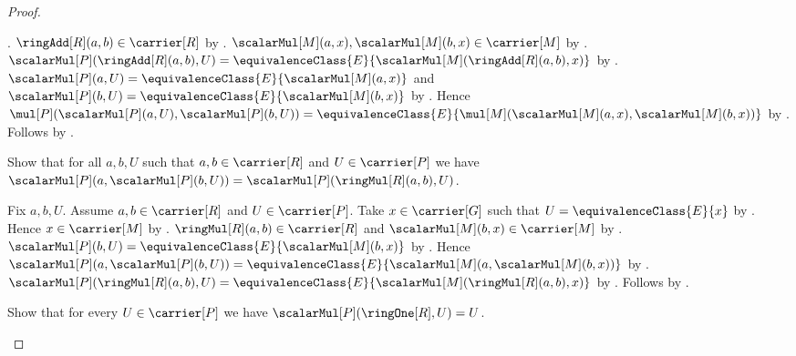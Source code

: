 \begin{proof}
\begin{subproof}
            .
        $\ringAdd[R](a,b)\in\carrier[R]$ by .
        $\scalarMul[M](a,x),\scalarMul[M](b,x)\in\carrier[M]$ by
            .
        $\scalarMul[P](\ringAdd[R](a,b),U)
            =\equivalenceClass{E}{
                \scalarMul[M](\ringAdd[R](a,b),x)}$ by
            .
        $\scalarMul[P](a,U)=
            \equivalenceClass{E}{\scalarMul[M](a,x)}$ and
            $\scalarMul[P](b,U)=
            \equivalenceClass{E}{\scalarMul[M](b,x)}$ by
            .
        Hence
            $\mul[P](\scalarMul[P](a,U),\scalarMul[P](b,U))
                =\equivalenceClass{E}{
                    \mul[M](\scalarMul[M](a,x),
                            \scalarMul[M](b,x))}$ by
            .
        Follows by .
    \end{subproof}
    Show that for all $a,b,U$ such that
        $a,b\in\carrier[R]$ and $U\in\carrier[P]$ we have
        $\scalarMul[P](a,\scalarMul[P](b,U))
            =\scalarMul[P](\ringMul[R](a,b),U)$.
    \begin{subproof}
        Fix $a,b,U$.
        Assume $a,b\in\carrier[R]$ and $U\in\carrier[P]$.
        Take $x\in\carrier[G]$ such that
            $U=\equivalenceClass{E}{x}$ by
            .
        Hence $x\in\carrier[M]$ by
            .
        $\ringMul[R](a,b)\in\carrier[R]$ and
            $\scalarMul[M](b,x)\in\carrier[M]$ by
            .
        $\scalarMul[P](b,U)=
            \equivalenceClass{E}{\scalarMul[M](b,x)}$ by
            .
        Hence $\scalarMul[P](a,\scalarMul[P](b,U))
            =\equivalenceClass{E}{
                \scalarMul[M](a,\scalarMul[M](b,x))}$ by
            .
        $\scalarMul[P](\ringMul[R](a,b),U)
            =\equivalenceClass{E}{
                \scalarMul[M](\ringMul[R](a,b),x)}$ by
            .
        Follows by .
    \end{subproof}
    Show that for every $U\in\carrier[P]$ we have
        $\scalarMul[P](\ringOne[R],U)=U$.
    \begin{subproof}

\end{subproof}
\end{proof}
